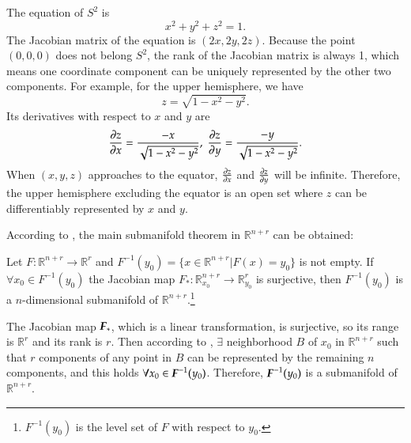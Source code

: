 \documentclass[11pt, a4paper]{book}
\begin{document}
\begin{Example}
  The equation of $S^2$ is
  \begin{equation*}
    x^2 + y^2 + z^2 = 1.
  \end{equation*}
  The Jacobian matrix of the equation is $(2x, 2y, 2z)$. Because the point $(0,0,0)$ does
  not belong $S^2$, the rank of the Jacobian matrix is always 1, which means one coordinate
  component can be uniquely represented by the other two components. For example, for the
  upper hemisphere, we have
  \begin{equation*}
    z = \sqrt{1 - x^2 - y^2}.
  \end{equation*}
  Its derivatives with respect to $x$ and $y$ are
  \begin{equation*}
    \frac{\partial z}{\partial x} = \frac{-x}{\sqrt{1 - x^2 - y^2}}, \; \frac{\partial z}{\partial
      y} = \frac{-y}{\sqrt{1 - x^2 - y^2}}.
  \end{equation*}
  When $(x,y,z)$ approaches to the equator, $\frac{\partial z}{\partial x}$ and
  $\frac{\partial z}{\partial y}$ will be infinite. Therefore, the upper hemisphere excluding
  the equator is an open set where $z$ can be differentiably represented by $x$ and $y$.
\end{Example}

According to , the main submanifold
theorem in $\mathbb{R}^{n+r}$ can be obtained:

\begin{Theorem}
  Let $F: \mathbb{R}^{n+r} \rightarrow \mathbb{R}^r$ and
  $F^{-1}(y_0) = \{x \in \mathbb{R}^{n+r} \vert F(x) = y_0\}$ is not empty. If
  $\forall x_0 \in F^{-1}(y_0)$ the Jacobian map
  $F_{*}: \mathbb{R}_{x_0}^{n+r} \rightarrow \mathbb{R}_{y_0}^r$ is surjective, then
  $F^{-1}(y_0)$ is a $n$-dimensional submanifold of
  $\mathbb{R}^{n+r}$.\footnote{$F^{-1}(y_0)$ is the level set of $F$ with respect to
    $y_0$.}
\end{Theorem}

\begin{Proof}
  The Jacobian map $\boldsymbol{F}_{*}$, which is a linear transformation, is
  surjective, so its range is $\mathbb{R}^r$ and its rank is $r$.
  Then according to ,
  $\exists$ neighborhood $B$ of $x_0$ in $\mathbb{R}^{n+r}$ such that
  $r$ components of any point in $B$ can be represented by the
  remaining $n$ components, and this holds
  $\forall x_0 \in \boldsymbol{F}^{-1}(y_0)$. Therefore,
  $\boldsymbol{F}^{-1}(y_0)$ is a submanifold of $\mathbb{R}^{n+r}$.
\end{Proof}
\end{document}
